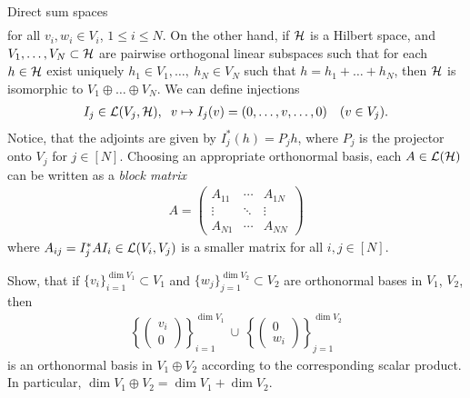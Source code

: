 \begin{subsection}{Direct sum spaces}
\begin{align*}
 \end{align*}
 for all $v_i,w_i \in V_i$, $1 \leq i \leq N$. On the other hand, if ${\mathcal H}$ is a Hilbert space, and $V_1,\dots, V_N \subset {\mathcal H}$ are pairwise orthogonal linear subspaces such that for each $h \in {\mathcal H}$
 exist uniquely $h_1 \in V_1, \dots, \ h_N \in V_N$ such that $h = h_1 + \dots + h_N$, then ${\mathcal H}$ is isomorphic to $V_1 \oplus \dots \oplus V_N$. We can define injections 
 \begin{align*}
  I_j \in {\mathcal L}(V_j, {\mathcal H}), \hspace{.2cm}  v \mapsto I_j (v) = (0, \dots,v, \dots, 0) &&(v \in V_j).
 \end{align*}
 Notice, that the adjoints are given by $I_j^\ast(h) = P_j h$, where $P_j$ is the projector onto $V_j$ for $j \in [N]$. Choosing an appropriate orthonormal basis, each $A \in {\mathcal L}({\mathcal H})$ can be 
 written as a \emph{block matrix} 
 \begin{align*}
  A = \left(\begin{array}{ccc}
  A_{11} & \cdots & A_{1N} \\ 
  \vdots & \ddots& \vdots \\ 
  A_{N1} & \cdots & A_{NN} \end{array}\right) 
 \end{align*}
 where $A_{ij} = I_j^\ast AI_i\in {\mathcal L}(V_i, V_j)$ is a smaller matrix for all $i,j \in [N]$.
 \begin{exercise}
  Show, that 
  if $\{v_i\}_{i=1}^{\dim V_1}\subset V_1$ and $\{w_j\}_{j=1}^{\dim V_2} \subset V_2$ are orthonormal bases in $V_1$, $V_2$, then
   \begin{align}
    \left\{\left(\begin{array}{c} v_i \\ 0 \end{array} \right) \right\}_{i=1}^{\dim V_1} \ \cup \ \left\{\left(\begin{array}{c} 0 \\ w_i \end{array} \right) \right\}_{j=1}^{\dim V_2}
   \end{align}
   is an orthonormal basis in $V_1 \oplus V_2$ according to the corresponding scalar product. In particular, $\dim V_1 \oplus V_2 = \dim V_1 + \dim V_2$.
 \end{exercise}
 \end{subsection}
